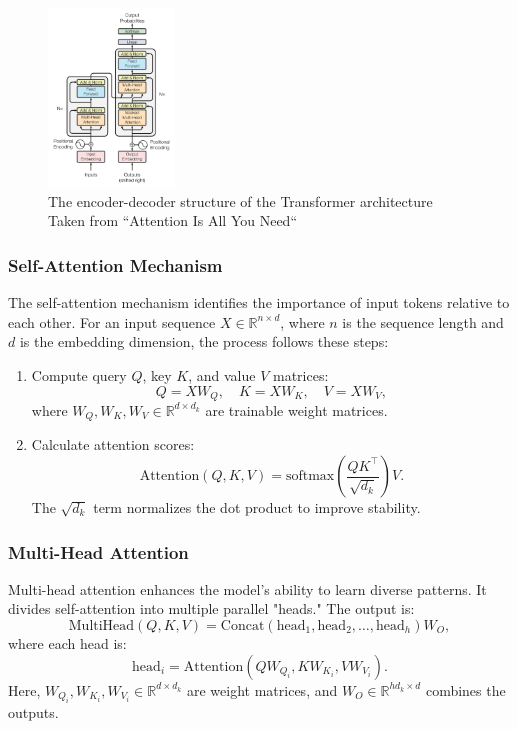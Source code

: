 \documentclass[fleqn,10pt]{SelfArx} %
\begin{document}
\begin{figure}[ht]\centering
	\includegraphics[width=0.3\textwidth]{Figures/attention.png}
	\caption{The  encoder-decoder structure of the Transformer architecture
	Taken from “Attention Is All You Need“\cite{vaswani2023attentionneed}}
	\label{fig:tran}
\end{figure}

\subsubsection{Self-Attention Mechanism}

The self-attention mechanism identifies the importance of input tokens relative to each other. For an input sequence $X \in \mathbb{R}^{n \times d}$, where $n$ is the sequence length and $d$ is the embedding dimension, the process follows these steps:
\begin{enumerate}
    \item Compute query $Q$, key $K$, and value $V$ matrices:
    \[
    Q = XW_Q, \quad K = XW_K, \quad V = XW_V,
    \]
    where $W_Q, W_K, W_V \in \mathbb{R}^{d \times d_k}$ are trainable weight matrices.
    \item Calculate attention scores:
    \[
    \text{Attention}(Q, K, V) = \text{softmax}\left(\frac{QK^\top}{\sqrt{d_k}}\right)V.
    \]
    The $\sqrt{d_k}$ term normalizes the dot product to improve stability.
\end{enumerate}

\subsubsection{Multi-Head Attention}

Multi-head attention enhances the model's ability to learn diverse patterns. It divides self-attention into multiple parallel "heads." The output is:
\[
\text{MultiHead}(Q, K, V) = \text{Concat}(\text{head}_1, \text{head}_2, \ldots, \text{head}_h)W_O,
\]
where each head is:
\[
\text{head}_i = \text{Attention}(QW_{Q_i}, KW_{K_i}, VW_{V_i}).
\]
Here, $W_{Q_i}, W_{K_i}, W_{V_i} \in \mathbb{R}^{d \times d_k}$ are weight matrices, and $W_O \in \mathbb{R}^{hd_k \times d}$ combines the outputs.
\end{document}
